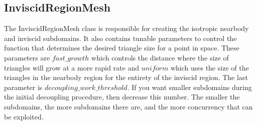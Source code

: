 \documentclass[manuscript, screen]{acmart}
\begin{document}
\subsection{InviscidRegionMesh}

The InviscidRegionMesh class is responsible for creating the isotropic nearbody and inviscid subdomains. It also contains tunable parameters to control the function that determines the desired triangle size for a point in space. These parameters are $fast\_growth$ which controls the distance where the size of triangles will grow at a more rapid rate and $uniform$ which uses the size of the triangles in the nearbody region for the entirety of the inviscid region. The last parameter is $decoupling\_work\_threshold$. If you want smaller subdomains during the initial decoupling procedure, then decrease this number. The smaller the subdomains, the more subdomains there are, and the more concurrency that can be exploited.
\end{document}
